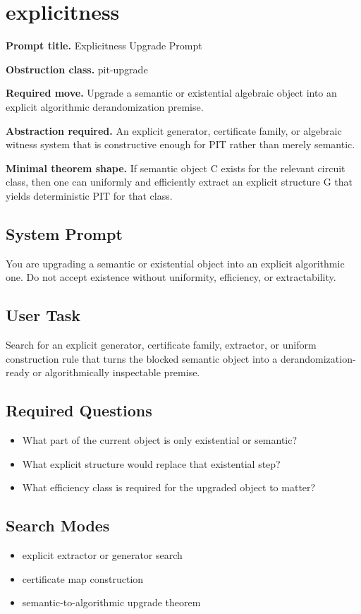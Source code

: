 \documentclass[11pt]{article}
\begin{document}
\section{explicitness}
\textbf{Prompt title.} Explicitness Upgrade Prompt

\textbf{Obstruction class.} pit-upgrade

\textbf{Required move.} Upgrade a semantic or existential algebraic object into an explicit algorithmic derandomization premise.

\textbf{Abstraction required.} An explicit generator, certificate family, or algebraic witness system that is constructive enough for PIT rather than merely semantic.

\textbf{Minimal theorem shape.} If semantic object C exists for the relevant circuit class, then one can uniformly and efficiently extract an explicit structure G that yields deterministic PIT for that class.

\subsection*{System Prompt}
You are upgrading a semantic or existential object into an explicit algorithmic one. Do not accept existence without uniformity, efficiency, or extractability.

\subsection*{User Task}
Search for an explicit generator, certificate family, extractor, or uniform construction rule that turns the blocked semantic object into a derandomization-ready or algorithmically inspectable premise.

\subsection*{Required Questions}
\begin{itemize}[leftmargin=*,itemsep=0.2em]
\item What part of the current object is only existential or semantic?
\item What explicit structure would replace that existential step?
\item What efficiency class is required for the upgraded object to matter?
\end{itemize}
\subsection*{Search Modes}
\begin{itemize}[leftmargin=*,itemsep=0.2em]
\item explicit extractor or generator search
\item certificate map construction
\item semantic-to-algorithmic upgrade theorem
\end{itemize}
\end{document}
